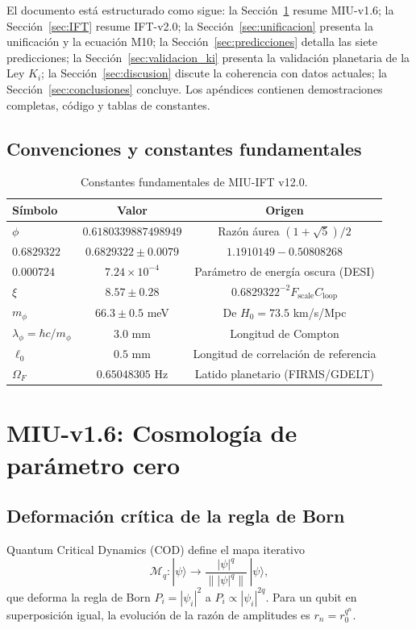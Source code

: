 \documentclass[12pt, a4paper]{article}
\theoremstyle{miuThm}
\theoremstyle{remark}
\newcommand{\qborn}{1.1910149}
\newcommand{\qcrit}{0.50808268}
\newcommand{\DeltaCOD}{0.6829322}
\newcommand{\eps}{0.000724}
\newcommand{\phiGolden}{0.6180339887498949}
\newcommand{\OmegaF}{0.65048305}
\begin{document}
El documento está estructurado como sigue: la Sección~\ref{sec:MIU} resume MIU-v1.6; la Sección~\ref{sec:IFT} resume IFT-v2.0; la Sección~\ref{sec:unificacion} presenta la unificación y la ecuación M10; la Sección~\ref{sec:predicciones} detalla las siete predicciones; la Sección~\ref{sec:validacion_ki} presenta la validación planetaria de la Ley $K_i$; la Sección~\ref{sec:discusion} discute la coherencia con datos actuales; la Sección~\ref{sec:conclusiones} concluye. Los apéndices contienen demostraciones completas, código y tablas de constantes.


\subsection{Convenciones y constantes fundamentales}
\begin{table}[h!]
\centering
\caption{Constantes fundamentales de MIU-IFT v12.0.}
\label{tab:ctes}
\begin{tabular}{lcc}
\toprule
\textbf{Símbolo} & \textbf{Valor} & \textbf{Origen} \\
\midrule
$\phi$ & $\phiGolden$ & Razón áurea $(1+\sqrt5)/2$ \\
$\DeltaCOD$ & $0.6829322 \pm 0.0079$ & $\qborn - \qcrit$ \\
$\eps$ & $7.24\times10^{-4}$ & Parámetro de energía oscura (DESI) \\
$\xi$ & $8.57 \pm 0.28$ & $\DeltaCOD^{-2}F_{\text{scale}}C_{\text{loop}}$ \\
$m_\phi$ & $66.3 \pm 0.5$ meV & De $H_0=73.5$ km/s/Mpc \\
$\lambda_\phi = \hbar c/m_\phi$ & $3.0$ mm & Longitud de Compton \\
$\ell_0$ & $0.5$ mm & Longitud de correlación de referencia \\
$\Omega_F$ & $\OmegaF$ Hz & Latido planetario (FIRMS/GDELT) \\
\bottomrule
\end{tabular}
\end{table}

\section{MIU-v1.6: Cosmología de parámetro cero}
\label{sec:MIU}

\subsection{Deformación crítica de la regla de Born}
Quantum Critical Dynamics (COD) define el mapa iterativo
\begin{equation}
\mathcal{M}_q: |\psi\rangle \rightarrow \frac{|\psi|^q}{\| |\psi|^q \|} \, |\psi\rangle,
\end{equation}
que deforma la regla de Born $P_i = |\psi_i|^2$ a $P_i \propto |\psi_i|^{2q}$. Para un qubit en superposición igual, la evolución de la razón de amplitudes es $r_n = r_0^{q^n}$.
\end{document}
